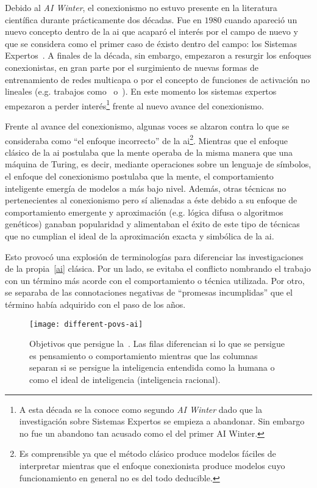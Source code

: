 Debido al \textit{AI Winter}, el conexionismo no estuvo presente en la literatura científica durante prácticamente dos décadas. Fue en $1980$ cuando apareció un nuevo concepto dentro de la \ac{ai} que acaparó el interés por el campo de nuevo y que se considera como el primer caso de éxisto dentro del campo: los Sistemas Expertos~\cite{russell2003artificial}. A finales de la década, sin embargo, empezaron a resurgir los enfoques conexionistas, en gran parte por el surgimiento de nuevas formas de entrenamiento de redes multicapa o por el concepto de funciones de activación no lineales (e.g. trabajos como~\cite{rumelhart1985learning} o~\cite{cybenko1989approximation}). En este momento los sistemas expertos empezaron a perder interés\footnote{A esta década se la conoce como segundo \textit{AI Winter} dado que la investigación sobre Sistemas Expertos se empieza a abandonar. Sin embargo no fue un abandono tan acusado como el del primer AI Winter.} frente al nuevo avance del conexionismo.

Frente al avance del conexionismo, algunas voces se alzaron contra lo que se consideraba como \enquote{el enfoque incorrecto} de la \ac{ai}\footnote{Es comprensible ya que el método clásico produce modelos fáciles de interpretar mientras que el enfoque conexionista produce modelos cuyo funcionamiento en general no es del todo deducible.}. Mientras que el enfoque clásico de la \ac{ai} postulaba que la mente operaba de la misma manera que una máquina de Turing, es decir, mediante operaciones sobre un lenguaje de símbolos, el enfoque del conexionismo postulaba que la mente, el comportamiento inteligente emergía de modelos a más bajo nivel. Además, otras técnicas no pertenecientes al conexionismo pero sí alienadas a éste debido a su enfoque de comportamiento emergente y aproximación (e.g. lógica difusa o algoritmos genéticos) ganaban popularidad y alimentaban el éxito de este tipo de técnicas que no cumplian el ideal de la aproximación exacta y simbólica de la \ac{ai}.

Esto provocó una explosión de terminologías para diferenciar las investigaciones de la propia~\ref{ai} clásica. Por un lado, se evitaba el conflicto nombrando el trabajo con un término más acorde con el comportamiento o técnica utilizada. Por otro, se separaba de las connotaciones negativas de \enquote{promesas incumplidas} que el término había adquirido con el paso de los años.

\begin{figure}
	\texttt{[image: different-povs-ai]}
	\caption{Objetivos que persigue la~. Las filas diferencian si lo que se persigue es pensamiento o comportamiento mientras que las columnas separan si se persigue la inteligencia entendida como la humana o como el ideal de inteligencia (inteligencia racional).}
	\label{fig:different-povs-ai}
\end{figure}

